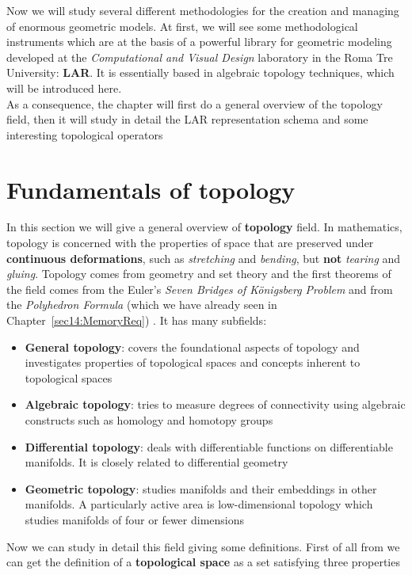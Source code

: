 Now we will study several different methodologies for the creation and managing of enormous geometric models. At first, we will see some methodological instruments which are at the basis of a powerful library for geometric modeling developed at the \textit{Computational and Visual Design} laboratory in the Roma Tre University: \textbf{LAR}. It is essentially based in algebraic topology techniques, which will be introduced here.\\

As a consequence, the chapter will first do a general overview of the topology field, then it will study in detail the LAR representation schema and some interesting topological operators

\section{Fundamentals of topology}\label{sec21:topologicalAlgebra}

In this section we will give a general overview of \textbf{topology} field. In mathematics, topology is concerned with the properties of space that are preserved under \textbf{continuous deformations}, such as \textit{stretching} and \textit{bending}, but \textbf{not} \textit{tearing} and \textit{gluing}. Topology comes from geometry and set theory and the first theorems of the field comes from the Euler's \textit{Seven Bridges of Königsberg Problem} and from the \textit{Polyhedron Formula} (which we have already seen in Chapter~\ref{sec14:MemoryReq}) . It has many subfields:
\begin{itemize}
 \item \textbf{General topology}: covers the foundational aspects of topology and investigates properties of topological spaces and concepts inherent to topological spaces
 \item \textbf{Algebraic topology}: tries to measure degrees of connectivity using algebraic constructs such as homology and homotopy groups
 \item \textbf{Differential topology}: deals with differentiable functions on differentiable manifolds. It is closely related to differential geometry
 \item \textbf{Geometric topology}: studies manifolds and their embeddings in other manifolds. A particularly active area is low-dimensional topology which studies manifolds of four or fewer dimensions
\end{itemize}

Now we can study in detail this field giving some definitions.
First of all from \cite{Kosniowski} we can get the definition of a \textbf{topological space} as a set satisfying three properties

